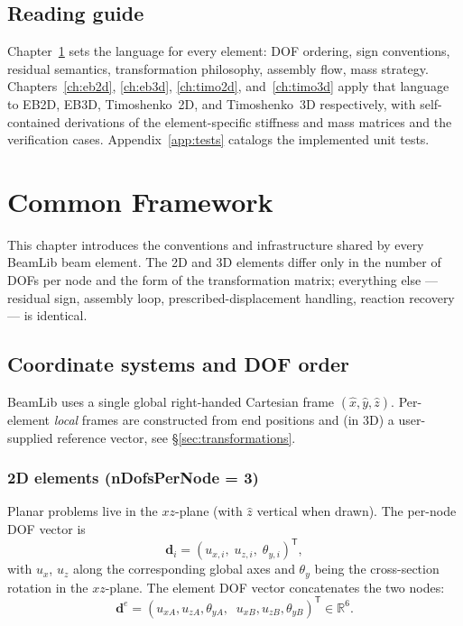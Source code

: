 \documentclass[11pt,a4paper]{book}
\newcommand{\bmath}[1]{\boldsymbol{#1}}
\newcommand{\xhat}{\hat{x}}
\newcommand{\yhat}{\hat{y}}
\newcommand{\zhat}{\hat{z}}
\begin{document}
\section*{Reading guide}

Chapter~\ref{ch:framework} sets the language for every element: DOF ordering, sign conventions, residual semantics, transformation philosophy, assembly flow, mass strategy. Chapters~\ref{ch:eb2d}, \ref{ch:eb3d}, \ref{ch:timo2d}, and~\ref{ch:timo3d} apply that language to EB2D, EB3D, Timoshenko~2D, and Timoshenko~3D respectively, with self-contained derivations of the element-specific stiffness and mass matrices and the verification cases. Appendix~\ref{app:tests} catalogs the implemented unit tests.

\mainmatter

\chapter{Common Framework}\label{ch:framework}

This chapter introduces the conventions and infrastructure shared by every BeamLib beam element. The 2D and 3D elements differ only in the number of DOFs per node and the form of the transformation matrix; everything else --- residual sign, assembly loop, prescribed-displacement handling, reaction recovery --- is identical.

\section{Coordinate systems and DOF order}\label{sec:dofs}

BeamLib uses a single global right-handed Cartesian frame $(\xhat, \yhat, \zhat)$. Per-element \emph{local} frames are constructed from end positions and (in 3D) a user-supplied reference vector, see \S\ref{sec:transformations}.

\subsection{2D elements (nDofsPerNode = 3)}

Planar problems live in the $xz$-plane (with $\zhat$ vertical when drawn). The per-node DOF vector is
\[
\bmath{d}_i = (u_{x,i},\; u_{z,i},\; \theta_{y,i})^\mathsf{T},
\]
with $u_x$, $u_z$ along the corresponding global axes and $\theta_y$ being the cross-section rotation in the $xz$-plane. The element DOF vector concatenates the two nodes:
\[
\bmath{d}^e = (u_{xA}, u_{zA}, \theta_{yA},\;\;u_{xB}, u_{zB}, \theta_{yB})^\mathsf{T} \in \mathbb{R}^6.
\]
\end{document}
